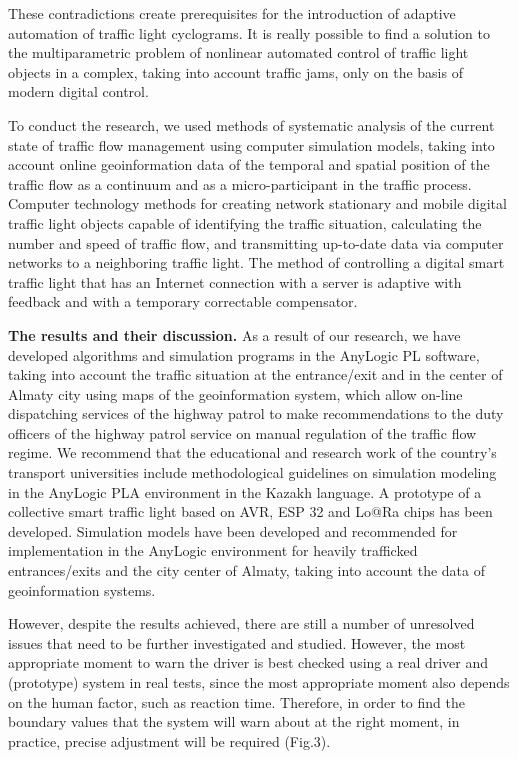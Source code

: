These contradictions create prerequisites for the introduction of
adaptive automation of traffic light cyclograms. It is really possible
to find a solution to the multiparametric problem of nonlinear automated
control of traffic light objects in a complex, taking into account
traffic jams, only on the basis of modern digital control.

To conduct the research, we used methods of systematic analysis of the
current state of traffic flow management using computer simulation
models, taking into account online geoinformation data of the temporal
and spatial position of the traffic flow as a continuum and as a
micro-participant in the traffic process. Computer technology methods
for creating network stationary and mobile digital traffic light objects
capable of identifying the traffic situation, calculating the number and
speed of traffic flow, and transmitting up-to-date data via computer
networks to a neighboring traffic light. The method of controlling a
digital smart traffic light that has an Internet connection with a
server is adaptive with feedback and with a temporary correctable
compensator.

\textbf{The results and their discussion.} As a result of our research,
we have developed algorithms and simulation programs in the AnyLogic PL
software, taking into account the traffic situation at the entrance/exit
and in the center of Almaty city using maps of the geoinformation
system, which allow on-line dispatching services of the highway patrol
to make recommendations to the duty officers of the highway patrol
service on manual regulation of the traffic flow regime. We recommend
that the educational and research work of the country's transport
universities include methodological guidelines on simulation modeling in
the AnyLogic PLA environment in the Kazakh language. A prototype of a
collective smart traffic light based on AVR, ESP 32 and Lo@Ra chips has
been developed. Simulation models have been developed and recommended
for implementation in the AnyLogic environment for heavily trafficked
entrances/exits and the city center of Almaty, taking into account the
data of geoinformation systems.

However, despite the results achieved, there are still a number of
unresolved issues that need to be further investigated and studied.
However, the most appropriate moment to warn the driver is best checked
using a real driver and (prototype) system in real tests, since the most
appropriate moment also depends on the human factor, such as reaction
time. Therefore, in order to find the boundary values that the system
will warn about at the right moment, in practice, precise adjustment
will be required (Fig.3).

